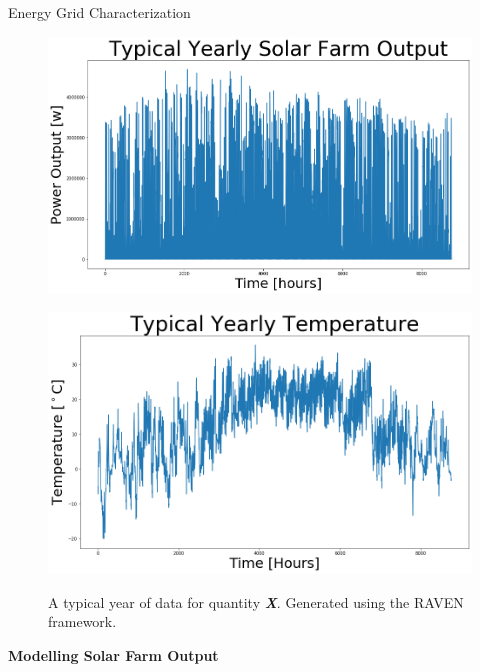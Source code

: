 \documentclass[final]{beamer}
\newlength{\onecolwid}
\newlength{\threecolwid}
\begin{document}
\begin{frame}[t]
\begin{columns}[t,totalwidth=\threecolwid]
\begin{column}{\onecolwid}
\begin{block}{Energy Grid Characterization}
\begin{figure}
\begin{minipage}{0.23\linewidth}
	\end{minipage}
	\begin{minipage}{0.23\linewidth}
		\centering
		\label{fig:solar}
		\includegraphics[width=\linewidth]{../figures/typical_solarpower.png}
	\end{minipage}
	\begin{minipage}{0.23\linewidth}
		\centering
		\label{fig:temp}
		\includegraphics[width=\linewidth]{../figures/typical_weather.png}
	\end{minipage}
	\caption{A typical year of data for quantity \textit{\textbf{X}}. Generated using the RAVEN framework.\cite{baker_optimal_2018}}
\end{figure}

\textbf{Modelling Solar Farm Output}\\


\end{block}
\end{column}
\end{columns}
\end{frame}
\end{document}
